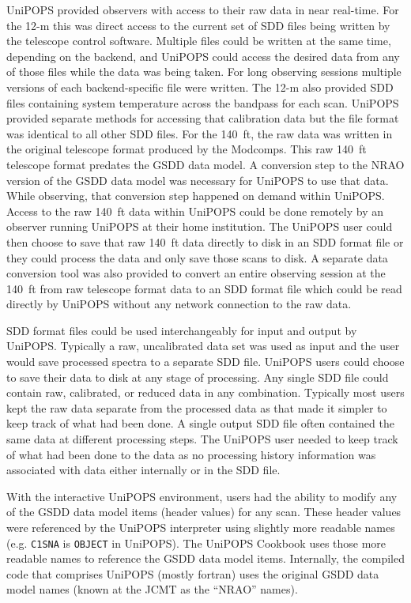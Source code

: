 \documentclass[final,authoryear,5p,times,twocolumn]{elsarticle}
\begin{document}
UniPOPS provided observers with access to their raw data in near
real-time.  For the 12-m this was direct access to the current set of
SDD files being written by the telescope control software.  Multiple
files could be written at the same time, depending on the backend, and
UniPOPS could access the desired data from any of those files
while the data was being taken.  For long observing sessions multiple
versions of each backend-specific file were written. The 12-m also provided
SDD files containing system temperature across the bandpass for each
scan.  UniPOPS provided separate methods for accessing that calibration
data but the file format was identical to all other SDD files.  For
the 140\, ft, the raw data was written in the original telescope
format produced by the Modcomps.  This raw 140\, ft telescope format
predates the GSDD data model.  A conversion step to the NRAO version of
the GSDD data model was necessary for UniPOPS to use that data.  
While observing, that conversion step happened on demand within UniPOPS.  
Access to the raw 140\, ft data within UniPOPS could be done remotely 
by an observer running UniPOPS at their home institution.  The 
UniPOPS user could then choose to save that raw 140\, ft data directly
to disk in an SDD format file or they could process the data and only
save those scans to disk.  A separate data conversion tool was also
provided to convert an entire observing session at the 140\, ft from 
raw telescope format data to an SDD format file which could be 
read directly by UniPOPS without any network connection to the 
raw data.

SDD format files could be used interchangeably for input and output by
UniPOPS.  Typically a raw, uncalibrated data set was used as input and
the user would save processed spectra to a separate SDD file.  UniPOPS
users could choose to save their data to disk at any stage of processing.
Any single SDD file could contain raw, calibrated, or reduced data in
any combination.  Typically most users kept the raw data separate from
the processed data as that made it simpler to keep track of what
had been done. A single output SDD file often contained the same data
at different processing steps.  The UniPOPS user needed to keep track
of what had been done to the data as no processing history information
was associated with data either internally or in the SDD file.

With the interactive UniPOPS environment, users had the ability to modify 
any of the GSDD data model items (header values) for any scan.  These
header values were referenced by the UniPOPS interpreter using slightly 
more readable names (e.g. \texttt{C1SNA} is \texttt{OBJECT}
in UniPOPS). The UniPOPS Cookbook \citep[]{UNIPOPS} uses those more 
readable names to reference the GSDD data model items.  Internally, 
the compiled code that comprises UniPOPS (mostly fortran) uses the 
original GSDD data model names (known at the JCMT as the ``NRAO'' names).
\end{document}
